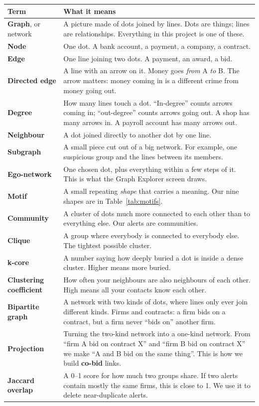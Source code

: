 \documentclass[11pt,a4paper]{article}
\begin{document}
\begin{longtable}{@{}p{4.1cm}p{11.4cm}@{}}
\toprule
\textbf{Term} & \textbf{What it means} \\
\midrule
\endhead
\textbf{Graph}, or network & A picture made of dots joined by lines. Dots are
things; lines are relationships. Everything in this project is one of these. \\
\textbf{Node} & One dot. A bank account, a payment, a company, a contract. \\
\textbf{Edge} & One line joining two dots. A payment, an award, a bid. \\
\textbf{Directed edge} & A line with an arrow on it. Money goes \emph{from} A
\emph{to} B. The arrow matters: money coming in is a different crime from money
going out. \\
\textbf{Degree} & How many lines touch a dot. ``In-degree'' counts arrows coming
in; ``out-degree'' counts arrows going out. A shop has many arrows in. A payroll
account has many arrows out. \\
\textbf{Neighbour} & A dot joined directly to another dot by one line. \\
\textbf{Subgraph} & A small piece cut out of a big network. For example, one
suspicious group and the lines between its members. \\
\textbf{Ego-network} & One chosen dot, plus everything within a few steps of it.
This is what the Graph Explorer screen draws. \\
\textbf{Motif} & A small repeating \emph{shape} that carries a meaning. Our nine
shapes are in Table~\ref{tab:motifs}. \\
\textbf{Community} & A cluster of dots much more connected to each other than to
everything else. Our alerts are communities. \\
\textbf{Clique} & A group where everybody is connected to everybody else. The
tightest possible cluster. \\
\textbf{k-core} & A number saying how deeply buried a dot is inside a dense
cluster. Higher means more buried. \\
\textbf{Clustering coefficient} & How often your neighbours are also neighbours
of each other. High means all your contacts know each other. \\
\textbf{Bipartite graph} & A network with two kinds of dots, where lines only
ever join different kinds. Firms and contracts: a firm bids on a contract, but a
firm never ``bids on'' another firm. \\
\textbf{Projection} & Turning the two-kind network into a one-kind network. From
``firm A bid on contract X'' and ``firm B bid on contract X'' we make ``A and B
bid on the same thing''. This is how we build \textbf{co-bid} links. \\
\textbf{Jaccard overlap} & A 0--1 score for how much two groups share. If two
alerts contain mostly the same firms, this is close to 1. We use it to delete
near-duplicate alerts. \\
\bottomrule
\end{longtable}
\end{document}
